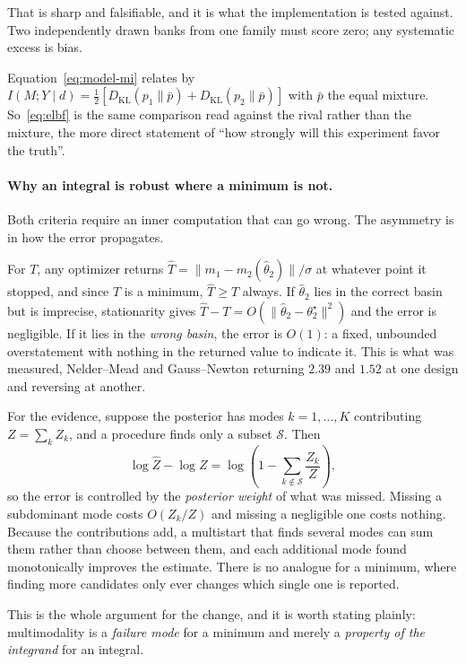 \documentclass[10pt]{article}
\begin{document}
That is sharp and falsifiable, and it is what the implementation is tested against. Two
independently drawn banks from one family must score zero; any systematic excess is bias.

Equation~\eqref{eq:model-mi} relates by
$I(M;Y\mid d) = \tfrac12[D_{\mathrm{KL}}(p_1\|\bar p) + D_{\mathrm{KL}}(p_2\|\bar p)]$ with
$\bar p$ the equal mixture. So~\eqref{eq:elbf} is the same comparison read against the rival
rather than the mixture, the more direct statement of ``how strongly will this experiment
favor the truth''.

\paragraph{Why an integral is robust where a minimum is not.}
Both criteria require an inner computation that can go wrong. The asymmetry is in how the
error propagates.

For $T$, any optimizer returns $\hat T = \lVert m_1 - m_2(\hat\theta_2)\rVert/\sigma$ at
whatever point it stopped, and since $T$ is a minimum, $\hat T \ge T$ always. If $\hat\theta_2$
lies in the correct basin but is imprecise, stationarity gives
$\hat T - T = O(\lVert\hat\theta_2 - \theta_2^\star\rVert^2)$ and the error is negligible. If
it lies in the \emph{wrong basin}, the error is $O(1)$: a fixed, unbounded overstatement with
nothing in the returned value to indicate it. This is what was measured, Nelder--Mead and
Gauss--Newton returning $2.39$ and $1.52$ at one design and reversing at another.

For the evidence, suppose the posterior has modes $k = 1,\dots,K$ contributing
$Z = \sum_k Z_k$, and a procedure finds only a subset $\mathcal{S}$. Then
%
\begin{equation}
\log \hat Z - \log Z
= \log\!\left(1 - \sum_{k \notin \mathcal{S}} \frac{Z_k}{Z}\right),
\label{eq:mode-loss}
\end{equation}
%
so the error is controlled by the \emph{posterior weight} of what was missed. Missing a
subdominant mode costs $O(Z_k/Z)$ and missing a negligible one costs nothing. Because the
contributions add, a multistart that finds several modes can sum them rather than choose
between them, and each additional mode found monotonically improves the estimate. There is no
analogue for a minimum, where finding more candidates only ever changes which single one is
reported.

This is the whole argument for the change, and it is worth stating plainly: multimodality is
a \emph{failure mode} for a minimum and merely a \emph{property of the integrand} for an
integral.
\end{document}
